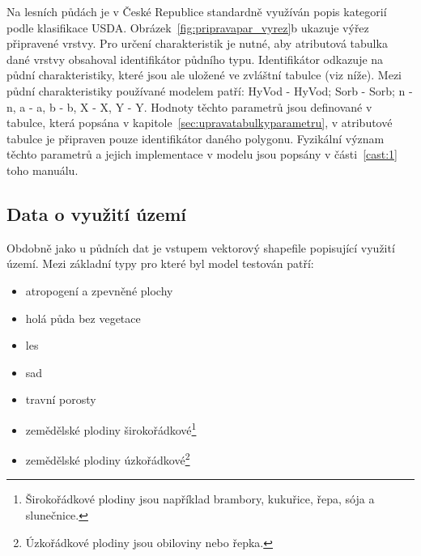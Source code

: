 Na lesních půdách je v České Republice standardně využíván popis kategorií podle klasifikace USDA.
Obrázek~\ref{fig:pripravapar_vyrez}b ukazuje výřez připravené vrstvy. Pro určení charakteristik je nutné, aby atributová tabulka dané vrstvy obsahoval identifikátor půdního typu. Identifikátor odkazuje na půdní charakteristiky, které jsou ale uložené ve zvláštní tabulce (viz níže). Mezi půdní charakteristiky používané modelem patří: \acs{HyVod} - \acl{HyVod}; \acs{Sorb} - \acl{Sorb}; \acs{n} - \acl{n},  \acs{a} - \acl{a}, \acs{b} - \acl{b}, \acs{X} - \acl{X}, \acs{Y} - \acl{Y}. Hodnoty těchto parametrů jsou definované v tabulce, která popsána v kapitole~\ref{sec:upravatabulkyparametru}, v atributové tabulce je připraven pouze identifikátor daného polygonu. Fyzikální význam těchto parametrů a jejich implementace v modelu jsou popsány v části~\ref{cast:1} toho manuálu. 


% 
%  
 
 
 
 
 
 
 
 
\subsection{Data o využití území} \label{sec:vstupvegetace}
Obdobně jako u půdních dat je vstupem vektorový shapefile popisující využití území. Mezi základní typy pro které byl model testován patří:
\begin{itemize} \itemsep -3pt
  \item atropogení a zpevněné plochy  
  \item holá půda bez vegetace
  \item les
  \item sad
  \item travní porosty
  \item zemědělské plodiny širokořádkové\footnote{Širokořádkové plodiny jsou například brambory, kukuřice, řepa, sója a slunečnice.}
  \item zemědělské plodiny úzkořádkové\footnote{Úzkořádkové plodiny jsou obiloviny nebo řepka.}
\end{itemize}


